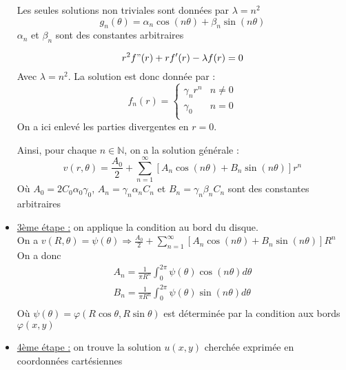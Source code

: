 \documentclass[../main.tex]{subfiles}
\begin{document}
\begin{itemize}
\begin{minipage}{.5\textwidth}
        Les seules solutions non triviales sont données par $\lambda = n^2$\\
        \begin{equation}
            g_n(\theta) = \alpha_n \cos(n\theta) + \beta_n \sin(n\theta)
        \end{equation}
        $\alpha_n$ et $\beta_n$ sont des constantes arbitraires\\
    \end{minipage}
    \vline
    \begin{minipage}{.5\textwidth}
        \begin{equation}
            r^2 f"(r) + rf'(r) -\lambda f(r) = 0
        \end{equation}
        Avec $\lambda = n^2$. La solution est donc donnée par : \begin{equation}
            f_n(r) = \begin{cases}
                \gamma_n r^n & n\neq 0\\
                \gamma_0 & n=0\\
            \end{cases}
        \end{equation}
        On a ici enlevé les parties divergentes en $r=0$.\\
    \end{minipage}
    Ainsi, pour chaque $n \in \mathbb{N}$, on a la solution générale : \begin{equation}
        v(r,\theta) = \frac{A_0}{2} + \sum_{n=1}^\infty [A_n \cos{(n\theta)} + B_n \sin{(n\theta)}]r^n
    \end{equation}
    Où $A_0 = 2C_0 \alpha_0 \gamma_0$, $A_n = \gamma_n \alpha_n C_n$ et $B_n = \gamma_n \beta_n C_n$ sont des constantes arbitraires\\
    \item \underline{3ème étape :} on applique la condition au bord du disque. \\
    On a $v(R,\theta) = \psi(\theta) \Rightarrow \frac{A_0}{2} + \sum_{n=1}^\infty [A_n \cos{(n\theta)} + B_n \sin{(n\theta)}]R^n$\\
    On a donc \begin{equation}
        \begin{gathered}
            A_n = \frac{1}{\pi R^n} \int_0^{2\pi} \psi(\theta) \cos{(n\theta)}d\theta\\
            B_n = \frac{1}{\pi R^n} \int_0^{2\pi} \psi(\theta) \sin{(n\theta)}d\theta\\
        \end{gathered}
    \end{equation}
    Où $\psi(\theta) = \varphi(R\cos{\theta}, R\sin{\theta})$ est déterminée par la condition aux bords $\varphi(x,y)$\\
    \item \underline{4ème étape :} on trouve la solution $u(x,y)$ cherchée exprimée en coordonnées cartésiennes\\
\end{itemize}
\end{document}
